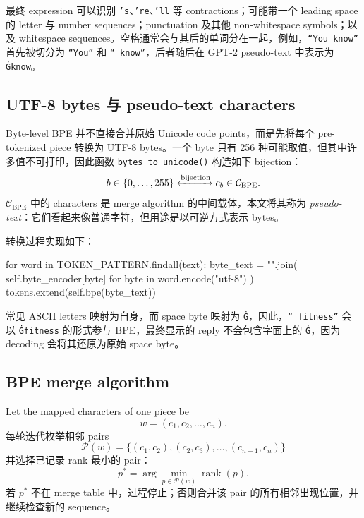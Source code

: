 \documentclass[12pt]{article}
\begin{document}
最终 expression 可以识别 \texttt{'s}、\texttt{'re}、\texttt{'ll} 等 contractions；可能带一个 leading space 的 letter 与 number sequences；punctuation 及其他 non-whitespace symbols；以及 whitespace sequences。空格通常会与其后的单词分在一起，例如，\texttt{``You know''} 首先被切分为 \texttt{``You''} 和 \texttt{`` know''}，后者随后在 GPT-2 pseudo-text 中表示为 \texttt{\string Ġknow}。

\subsection{UTF-8 bytes 与 pseudo-text characters}

Byte-level BPE 并不直接合并原始 Unicode code points，而是先将每个 pre-tokenized piece 转换为 UTF-8 bytes。一个 byte 只有 256 种可能取值，但其中许多值不可打印，因此函数 \texttt{bytes\_to\_unicode()} 构造如下 bijection：
\begin{equation}
b\in\{0,\ldots,255\}
\xleftrightarrow{\text{bijection}}
c_b\in\mathcal C_{\mathrm{BPE}}.
\end{equation}
$\mathcal C_{\mathrm{BPE}}$ 中的 characters 是 merge algorithm 的中间载体，本文将其称为 \emph{pseudo-text}：它们看起来像普通字符，但用途是以可逆方式表示 bytes。

转换过程实现如下：
\begin{pythoncode}[label={lst:byte-encode}]
for word in TOKEN_PATTERN.findall(text):
    byte_text = "".join(
        self.byte_encoder[byte]
        for byte in word.encode("utf-8")
    )
    tokens.extend(self.bpe(byte_text))
\end{pythoncode}
常见 ASCII letters 映射为自身，而 space byte 映射为 \texttt{\string Ġ}，因此，\texttt{`` fitness''} 会以 \texttt{\string Ġfitness} 的形式参与 BPE，最终显示的 reply 不会包含字面上的 \texttt{\string Ġ}，因为 decoding 会将其还原为原始 space byte。

\subsection{BPE merge algorithm}

Let the mapped characters of one piece be
\[
w=(c_1,c_2,\ldots,c_n).
\]
每轮迭代枚举相邻 pairs
\[
\mathcal P(w)=\{(c_1,c_2),(c_2,c_3),\ldots,(c_{n-1},c_n)\}
\]
并选择已记录 rank 最小的 pair：
\begin{equation}
p^*=\arg\min_{p\in\mathcal P(w)}\operatorname{rank}(p).
\end{equation}
若 $p^*$ 不在 merge table 中，过程停止；否则合并该 pair 的所有相邻出现位置，并继续检查新的 sequence。
\end{document}
